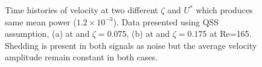 \begin{figure}
  \setlength{\unitlength}{\textwidth}
  \caption{Time histories of velocity at two different $\zeta$ and $U^*$ which produces same mean power ($1.2\times10^{-3}$). Data presented using QSS assumption, (a) at  and $\zeta=0.075$, (b) at  and $\zeta=0.175$ at Re=165. Shedding is present in both signals as noise but the average velocity amplitude remain constant in both cases.}
    \label{fig:time_hostory_velocity_same_power}
\end{figure}